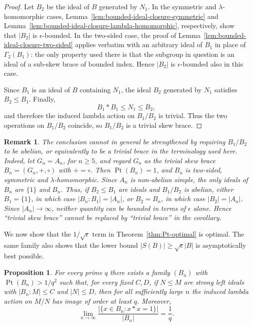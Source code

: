 \documentclass[10pt,a4paper]{amsart}
\numberwithin{equation}{section}
\newtheorem{pro}[equation]{Proposition}
\newtheorem{rem}[equation]{Remark}
\newcommand{\Pt}{\operatorname{Pt} }
\begin{document}
\begin{proof}
Let $B_2$ be the ideal of $B$ generated by $N_1$. In the symmetric and $\lambda$-homomorphic cases, Lemma~\ref{lem:bounded-ideal-closure-symmetric} and Lemma~\ref{lem:bounded-ideal-closure-lambda-homomorphic}, respectively, show that $|B_2|$ is $\epsilon$-bounded. In the two-sided case, the proof of Lemma~\ref{lem:bounded-ideal-closure-two-sided} applies verbatim with an arbitrary ideal of $B_1$ in place of $\Gamma_2(B_1)$: the only property used there is that the subgroup in question is an ideal of a sub-skew brace of bounded index. Hence $|B_2|$ is $\epsilon$-bounded also in this case.

Since $B_1$ is an ideal of $B$ containing $N_1$, the ideal $B_2$ generated by $N_1$ satisfies $B_2\leqslant B_1$. Finally,
$$
B_1*B_1\leqslant N_1\leqslant B_2,
$$
and therefore the induced lambda action on $B_1/B_2$ is trivial. Thus the two operations on $B_1/B_2$ coincide, so $B_1/B_2$ is a trivial skew brace.
\end{proof}

\begin{rem}
The conclusion cannot in general be strengthened by requiring $B_1/B_2$ to be abelian, or equivalently to be a trivial brace in the terminology used here. Indeed, let $G_n=A_n$, for $n\geqslant5$, and regard $G_n$ as the trivial skew brace $B_n=(G_n,+,\circ)$ with $+=\circ$. Then $\Pt(B_n)=1$, and $B_n$ is two-sided, symmetric and $\lambda$-homomorphic. Since $A_n$ is non-abelian simple, the only ideals of $B_n$ are $\{1\}$ and $B_n$. Thus, if $B_2\leqslant B_1$ are ideals and $B_1/B_2$ is abelian, either $B_1=\{1\}$, in which case $|B_n:B_1|=|A_n|$, or $B_2=B_n$, in which case $|B_2|=|A_n|$. Since $|A_n|\to\infty$, neither quantity can be bounded in terms of $\epsilon$ alone. Hence ``trivial skew brace'' cannot be replaced by ``trivial brace'' in the corollary.
\end{rem}



We now show that the $1/\sqrt{\epsilon}$ term in
Theorem~\ref{thm:Pt-optimal} is optimal. The same family also shows
that the lower bound $|S(B)|\geqslant\sqrt{\epsilon}|B|$ is
asymptotically best possible.

\begin{pro} %
For every prime $q$ there exists a family $(B_n)$ with
$\Pt(B_n)>1/q^2$ such that, for every fixed $C,D$, if
$N\leqslant M$ are strong left ideals with $|B_n:M|\leqslant C$ and
$|N|\leqslant D$, then for all sufficiently large $n$ the induced
lambda action on $M/N$ has image of order at least $q$. Moreover,
$$
\lim_{n\to\infty}
\frac{|\{x\in B_n:x*x= 1\}|}{|B_n|}=\frac1q.
$$
\end{pro}
\end{document}
